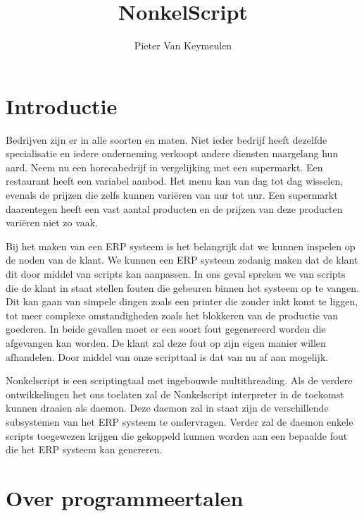 \documentclass[11pt,a4paper]{article}
\author{Pieter Van Keymeulen}
\title{NonkelScript}
\begin{document}

\newpage

\tableofcontents
\newpage

\section{Introductie}
Bedrijven zijn er in alle soorten en maten. Niet ieder bedrijf heeft dezelfde specialisatie en iedere onderneming verkoopt andere diensten naargelang hun aard. Neem nu een horecabedrijf in vergelijking met een supermarkt. Een restaurant heeft een variabel aanbod. Het menu kan van dag tot dag wisselen, evenals de prijzen die zelfs kunnen variëren van uur tot uur. Een supermarkt daarentegen heeft een vast aantal producten en de prijzen van deze producten variëren niet zo vaak.

Bij het maken van een ERP systeem is het belangrijk dat we kunnen inspelen op de noden van de klant. We kunnen een ERP systeem zodanig maken dat de klant dit door middel van scripts kan aanpassen. In ons geval spreken we van scripts die de klant in staat stellen fouten die gebeuren binnen het systeem op te vangen. Dit kan gaan van simpele dingen zoals een printer die zonder inkt komt te liggen, tot meer complexe omstandigheden zoals het blokkeren van de productie van goederen. In beide gevallen moet er een soort fout gegenereerd worden die afgevangen kan worden. De klant zal deze fout op zijn eigen manier willen afhandelen. Door middel van onze scripttaal is dat van nu af aan mogelijk.

Nonkelscript is een scriptingtaal met ingebouwde multithreading. Als de verdere ontwikkelingen het ons toelaten zal de Nonkelscript interpreter in de toekomst kunnen draaien als daemon. Deze daemon zal in staat zijn de verschillende subsystemen van het ERP systeem te ondervragen. Verder zal de daemon enkele scripts toegewezen krijgen die gekoppeld kunnen worden aan een bepaalde fout die het ERP systeem kan genereren.

\section{Over programmeertalen}
\end{document}
